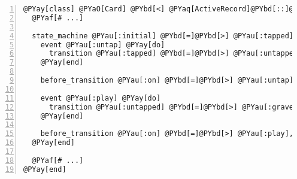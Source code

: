 \begin{Verbatim}[commandchars=@\[\],numbers=left,firstnumber=1,stepnumber=1]
@PYay[class] @PYaO[Card] @PYbd[<] @PYaq[ActiveRecord]@PYbd[::]@PYaq[Base]
  @PYaf[# ...]

  state_machine @PYau[:initial] @PYbd[=]@PYbd[>] @PYau[:tapped] @PYay[do]
    event @PYau[:untap] @PYay[do]
      transition @PYau[:tapped] @PYbd[=]@PYbd[>] @PYau[:untapped]
    @PYay[end]

    before_transition @PYau[:on] @PYbd[=]@PYbd[>] @PYau[:untap], @PYau[:do] @PYbd[=]@PYbd[>] @PYau[:before_untap]

    event @PYau[:play] @PYay[do]
      transition @PYau[:untapped] @PYbd[=]@PYbd[>] @PYau[:graveyard]
    @PYay[end]

    before_transition @PYau[:on] @PYbd[=]@PYbd[>] @PYau[:play], @PYau[:do] @PYbd[=]@PYbd[>] @PYau[:before_play]
  @PYay[end]

  @PYaf[# ...]
@PYay[end]
\end{Verbatim}
